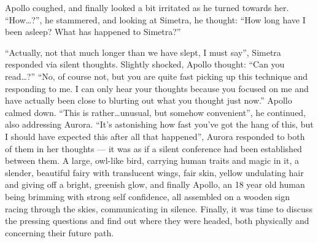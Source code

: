 Apollo coughed, and finally looked a bit irritated as he turned towards her. \enquote{How\dots?}, he stammered, and looking at Simetra, he thought: \enquote{How long have I been asleep? What has happened to Simetra?}

\enquote{Actually, not that much longer than we have slept, I must say}, Simetra responded via silent thoughts. Slightly shocked, Apollo thought: \enquote{Can you read\dots?} \enquote{No, of course not, but you are quite fast picking up this technique and responding to me. I can only hear your thoughts because you focused on me and have actually been close to blurting out what you thought just now.}
Apollo calmed down. \enquote{This is rather\dots unusual, but somehow convenient}, he continued, also addressing Aurora. \enquote{It's astonishing how fast you've got the hang of this, but I should have expected this after all that happened}, Aurora responded to both of them in her thoughts --- it was as if a silent conference had been established between them. A large, owl-like bird, carrying human traits and magic in it, a slender, beautiful fairy with translucent wings, fair skin, yellow undulating hair and giving off a bright, greenish glow, and finally Apollo, an 18 year old human being brimming with strong self confidence, all assembled on a wooden sign racing through the skies, communicating in silence. Finally, it was time to discuss the pressing questions and find out where they were headed, both physically and concerning their future path.
